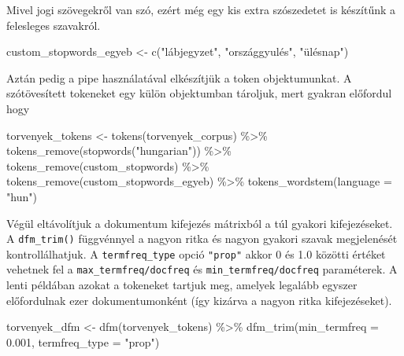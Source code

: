 \documentclass[
]{book}
\newenvironment{Shaded}{\begin{snugshade}}{\end{snugshade}}
\newcommand{\AttributeTok}[1]{\textcolor[rgb]{0.77,0.63,0.00}{#1}}
\newcommand{\FloatTok}[1]{\textcolor[rgb]{0.00,0.00,0.81}{#1}}
\newcommand{\FunctionTok}[1]{\textcolor[rgb]{0.00,0.00,0.00}{#1}}
\newcommand{\NormalTok}[1]{#1}
\newcommand{\OtherTok}[1]{\textcolor[rgb]{0.56,0.35,0.01}{#1}}
\newcommand{\SpecialCharTok}[1]{\textcolor[rgb]{0.00,0.00,0.00}{#1}}
\newcommand{\StringTok}[1]{\textcolor[rgb]{0.31,0.60,0.02}{#1}}
\begin{document}
Mivel jogi szövegekről van szó, ezért még egy kis extra szószedetet is
készítűnk a felesleges szavakról.

\begin{Shaded}
\begin{Highlighting}[]
\NormalTok{custom\_stopwords\_egyeb }\OtherTok{\textless{}{-}} \FunctionTok{c}\NormalTok{(}\StringTok{"lábjegyzet"}\NormalTok{, }\StringTok{"országgyulés"}\NormalTok{, }\StringTok{"ülésnap"}\NormalTok{)}
\end{Highlighting}
\end{Shaded}

Aztán pedig a pipe használatával elkészítjük a token objektumunkat. A
szótövesített tokeneket egy külön objektumban tároljuk, mert gyakran
előfordul hogy

\begin{Shaded}
\begin{Highlighting}[]
\NormalTok{torvenyek\_tokens }\OtherTok{\textless{}{-}} \FunctionTok{tokens}\NormalTok{(torvenyek\_corpus) }\SpecialCharTok{\%\textgreater{}\%}
  \FunctionTok{tokens\_remove}\NormalTok{(}\FunctionTok{stopwords}\NormalTok{(}\StringTok{"hungarian"}\NormalTok{)) }\SpecialCharTok{\%\textgreater{}\%}
  \FunctionTok{tokens\_remove}\NormalTok{(custom\_stopwords) }\SpecialCharTok{\%\textgreater{}\%}
  \FunctionTok{tokens\_remove}\NormalTok{(custom\_stopwords\_egyeb) }\SpecialCharTok{\%\textgreater{}\%}
  \FunctionTok{tokens\_wordstem}\NormalTok{(}\AttributeTok{language =} \StringTok{"hun"}\NormalTok{)}
\end{Highlighting}
\end{Shaded}

Végül eltávolítjuk a dokumentum kifejezés mátrixból a túl gyakori
kifejezéseket. A \texttt{dfm\_trim()} függvénnyel a nagyon ritka és
nagyon gyakori szavak megjelenését kontrollálhatjuk. A
\texttt{termfreq\_type} opció \texttt{"prop"} akkor 0 és 1.0 közötti
értéket vehetnek fel a \texttt{max\_termfreq/docfreq} és
\texttt{min\_termfreq/docfreq} paraméterek. A lenti példában azokat a
tokeneket tartjuk meg, amelyek legalább egyszer előfordulnak ezer
dokumentumonként (így kizárva a nagyon ritka kifejezéseket).

\begin{Shaded}
\begin{Highlighting}[]
\NormalTok{torvenyek\_dfm }\OtherTok{\textless{}{-}} \FunctionTok{dfm}\NormalTok{(torvenyek\_tokens) }\SpecialCharTok{\%\textgreater{}\%}
  \FunctionTok{dfm\_trim}\NormalTok{(}\AttributeTok{min\_termfreq =} \FloatTok{0.001}\NormalTok{, }\AttributeTok{termfreq\_type =} \StringTok{"prop"}\NormalTok{)}
\end{Highlighting}
\end{Shaded}
\end{document}
